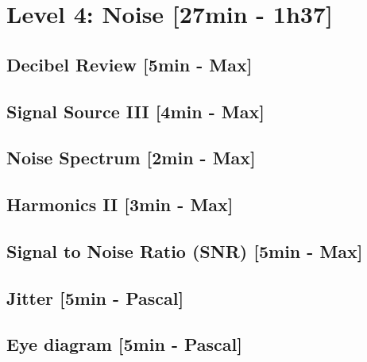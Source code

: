
\section{Level 4: Noise [27min - 1h37]}
\subsection{Decibel Review [5min - Max]}

\subsection{Signal Source III [4min - Max]}

\subsection{Noise Spectrum [2min - Max]}

\subsection{Harmonics II [3min - Max]}

\subsection{Signal to Noise Ratio (SNR) [5min - Max]}

\subsection{Jitter [5min - Pascal]}


\subsection{Eye diagram [5min - Pascal]}
